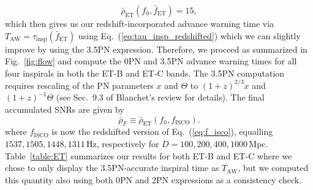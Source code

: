 \documentclass[prd,amsmath,amssymb,aps,floats,amsfonts,notitlepage,superscriptaddress,eqsecnum,nofootinbib,10pt]{revtex4-1}
\newcommand{\be}{\begin{equation}}
\newcommand{\ee}{\end{equation}}
\begin{document}
%
\be
\bar\rho_\text{ET}(f_0,\bar{f}_\text{ET}) = 15 \label{eq:ET_fbar},
\ee
%
%
which then gives us our redshift-incorporated advance warning time via $T_\text{AW}=\tau_\text{insp}(\bar{f}_\text{ET})$ using Eq.~(\ref{eq:tau_insp_redshifted}) which we can slightly improve by using the 3.5PN expression. 
Therefore, we proceed as summarized in Fig.~\ref{fig:flow} and compute the 0PN and 3.5PN advance warning times 
for all four inspirals in both the ET-B and ET-C bands.
The 3.5PN computation requires rescaling of the PN parameters $x$ and $\Theta$ to $(1+z)^{2/3} x$ and $(1+z)^{-1}\Theta $ (see Sec.~9.3 of 
Blanchet's review \cite{Blanchet_LRR} for details).
The final accumulated SNRs are given by
%
\be
\bar\rho_{F}\equiv \bar\rho_\text{ET}(f_0,f_\text{ISCO})  .\label{eq:rhoF_ET}
\ee
%
where $f_\text{ISCO}$ is now the redshifted version of Eq.~(\ref{eq:f_isco}), equalling $1537, 1505, 1448, 1311\,$Hz, respectively for $D=100,200,400, 1000\,$Mpc.
Table~\ref{table:ET} summarizes our results for both ET-B and ET-C where we chose to only display the 3.5PN-accurate inspiral time as $T_\text{AW}$,
but we computed this quantity also using both 0PN and 2PN expressions as a consistency check.
\end{document}

